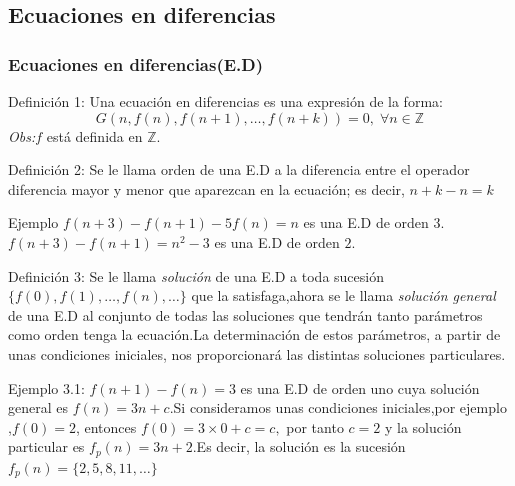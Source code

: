 \documentclass[spanish, utf8,handout]{beamer} %
\theoremstyle{definition}
\begin{document}
\subsection{Ecuaciones en diferencias}
\begin{frame}
	\frametitle{Ecuaciones en diferencias(E.D)}
	\begin{block}{Definición 1:}
	Una ecuación en diferencias es una expresión de la forma:
	$$
	G(n,f(n),f(n+1),\ldots,f(n+k))=0, \; \forall n \in \mathbb{Z}
	$$
	\emph{Obs:}\hspace{2mm}$ f $ está definida en $ \mathbb{Z} .$
	\end{block}
	\begin{block}{Definición 2:}
	Se le llama orden de una E.D a la diferencia entre el operador diferencia mayor y menor que aparezcan en la ecuación; es decir, $ n+k-n=k $
	\end{block}
\begin{block}{Ejemplo}
	$ f(n+3)-f(n+1)-5f(n)=n $ es una E.D de orden $ 3 .$\\$ f(n+3)-f(n+1)=n^{2}-3 $ es una E.D de orden $ 2 .$
\end{block}
\end{frame}
\begin{frame}
\begin{block}{Definición 3:}
	Se le llama \emph{solución} de una E.D a toda sucesión $  \{f(0),f(1),\ldots,f(n),\ldots \} $ que la satisfaga,ahora se le llama \emph{solución general} de una E.D al conjunto de todas las soluciones que tendrán tanto parámetros como orden tenga la ecuación.La determinación de estos parámetros, a partir de unas
	condiciones iniciales, nos proporcionará las distintas soluciones particulares.
\end{block}
\begin{block}{Ejemplo 3.1:}
	$ f(n+1)-f(n)=3 $ es una E.D de orden uno cuya solución general es $ f(n)=3n+c $.Si consideramos unas condiciones iniciales,por ejemplo ,$ f(0)=2$, entonces $ f(0)=3\times0+c=c,$ por tanto $ c=2 $ y la solución particular es $ f_{p}(n)=3n+2.$Es decir, la solución es la sucesión $ f_{p}(n)=\{2,5,8,11,\ldots\} $
\end{block}
\end{frame}
\end{document}
